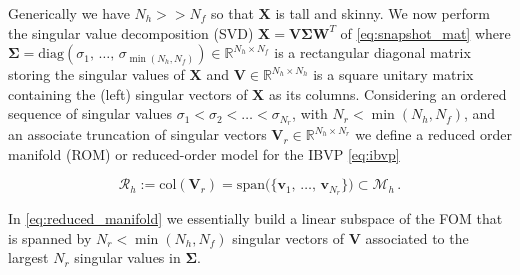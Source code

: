 \documentclass[../main.tex]{subfiles}
\begin{document}
Generically we have $N_{h}>>N_{f}$ so that $\boldsymbol{X}$ is tall and skinny.
We now perform the singular value decomposition (SVD) $\boldsymbol{X}=\boldsymbol{V}\boldsymbol{\Sigma}\boldsymbol{W}^{T}$ of \eqref{eq:snapshot_mat} where $\boldsymbol{\Sigma}=\text{diag}(\sigma_{1},\,\dots,\,\sigma_{\min(N_{h},N_{f})})\in \mathbb{R}^{N_{h}\times N_{f}}$ is a rectangular diagonal matrix storing the singular values of $\boldsymbol{X}$ and $\boldsymbol{V}\in \mathbb{R}^{N_{h}\times N_{h}}$ is a square unitary matrix containing the (left) singular vectors of $\boldsymbol{X}$ as its columns.
Considering an ordered sequence of singular values $\sigma_{1} < \sigma_{2} < \dots < \sigma_{N_{r}}$, with $N_{r} < \min(N_{h},N_{f})$, and an associate truncation of singular vectors $\boldsymbol{V}_{r}\in \mathbb{R}^{N_{h}\times N_{r}}$ we define a reduced order manifold (ROM) or reduced-order model for the IBVP \eqref{eq:ibvp}

\begin{equation}\label{eq:reduced_manifold}
        \mathcal{R}_{h} := \text{col}(\boldsymbol{V}_{r}) = \text{span}\big(\{\boldsymbol{v}_{1},\,\dots,\,\boldsymbol{v}_{N_{r}}\}\big)\subset\mathcal{M}_{h}\,.
\end{equation}

In \eqref{eq:reduced_manifold} we essentially build a linear subspace of the FOM that is spanned by $N_{r} < \min(N_{h},N_{f})$ singular vectors of $\boldsymbol{V}$ associated to the largest $N_{r}$ singular values in $\boldsymbol{\Sigma}$.
\end{document}
